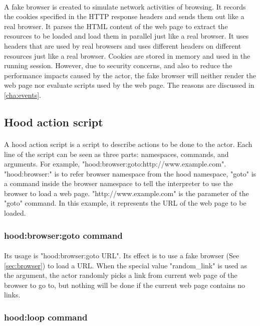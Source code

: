 \documentclass[mscthesis]{usiinfthesis}
\begin{document}
\paragraph{}
A fake browser is created to simulate network activities of browsing. It records the cookies specified in the HTTP response headers and sends them out like a real browser. It parses the HTML content of the web page to extract the resources to be loaded and load them in parallel just like a real browser. It uses headers that are used by real browsers and uses different headers on different resources just like a real browser. Cookies are stored in memory and used in the running session. However, due to security concerns, and also to reduce the performance impacts caused by the actor, the fake browser will neither render the web page nor evaluate scripts used by the web page. The reasons are discussed in \cref{cha:events}.

\subsection{Hood action script}
\paragraph{}
A hood action script is a script to describe actions to be done to the actor. Each line of the script can be seen as three parts: namespaces, commands, and arguments. For example, \newline "hood:browser:goto:http://www.example.com". "hood:browser:" is to refer browser namespace from the hood namespace, "goto" is a command inside the browser namespace to tell the interpreter to use the browser to load a web page. "http://www.example.com" is the parameter of the "goto" command. In this example, it represents the URL of the web page to be loaded.
\subsubsection{hood:browser:goto command}
\paragraph{}
Its usage is "hood:browser:goto URL". Its effect is to use a fake browser (See \cref{sec:browser}) to load a URL. When the special value "random\_link" is used as the argument, the actor randomly picks a link from current web page of the browser to go to, but nothing will be done if the current web page contains no links.
\subsubsection{hood:loop command}
\end{document}
